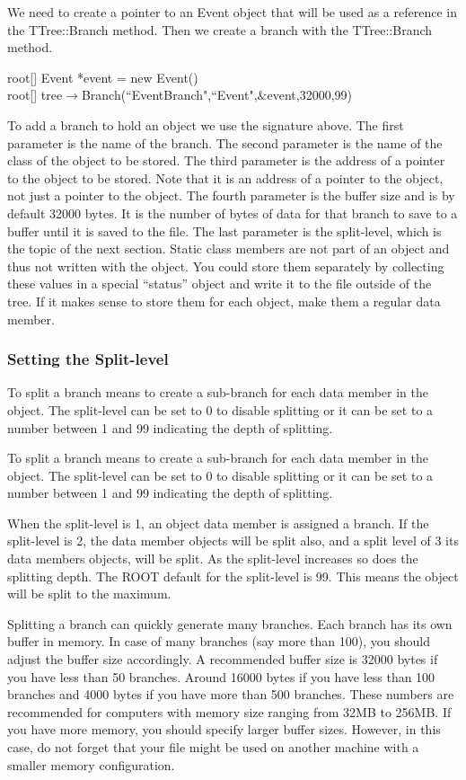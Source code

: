 \documentclass[12pt,a4paper]{article}
\begin{document}
We need to create a pointer to an Event object that will be used as a reference in the TTree::Branch method. Then we create a branch with the TTree::Branch method.

root[] Event *event = new Event() \\
root[] tree$\rightarrow$Branch(``EventBranch",``Event",$\&$event,32000,99)

To add a branch to hold an object we use the signature above. The first parameter is the name of the branch. The second parameter is the name of the class of the object to be stored. The third parameter is the address of a pointer to the object to be stored. Note that it is an address of a pointer to the object, not just a pointer to the object. The fourth parameter is the buffer size and is by default 32000 bytes. It is the number of bytes of data for that branch to save to a buffer until it is saved to the file. The last parameter is the split-level, which is the topic of the next section. Static class members are not part of an object and thus not written with the object. You could store them separately by collecting these values in a special “status” object and write it to the file outside of the tree. If it makes sense to store them for each object, make them a regular data member.

\subsubsection{Setting the Split-level}
To split a branch means to create a sub-branch for each data member in the object. The split-level can be set to 0 to disable splitting or it can be set to a number between 1 and 99 indicating the depth of splitting.

To split a branch means to create a sub-branch for each data member in the object. The split-level can be set to 0 to disable splitting or it can be set to a number between 1 and 99 indicating the depth of splitting.

When the split-level is 1, an object data member is assigned a branch. If the split-level is 2, the data member objects will be split also, and a split level of 3 its data members objects, will be split. As the split-level increases so does the splitting depth. The ROOT default for the split-level is 99. This means the object will be split to the maximum.

Splitting a branch can quickly generate many branches. Each branch has its own buffer in memory. In case of many branches (say more than 100), you should adjust the buffer size accordingly. A recommended buffer size is 32000 bytes if you have less than 50 branches. Around 16000 bytes if you have less than 100 branches and 4000 bytes if you have more than 500 branches. These numbers are recommended for computers with memory size ranging from 32MB to 256MB. If you have more memory, you should specify larger buffer sizes. However, in this case, do not forget that your file might be used on another machine with a smaller memory configuration.
\end{document}
